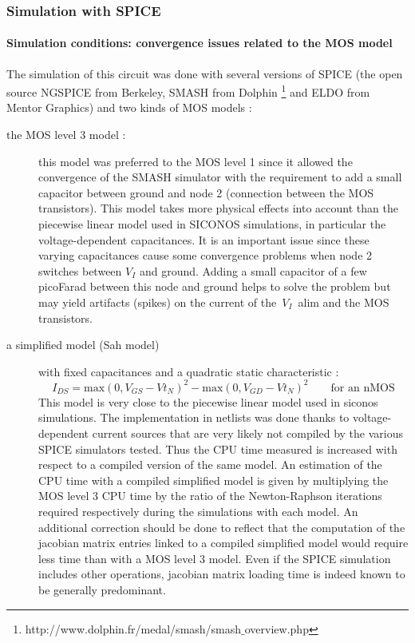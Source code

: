 \documentclass{article}
\begin{document}
\subsubsection{Simulation with SPICE }

\paragraph{Simulation conditions: convergence issues related to the MOS model}
The simulation of this circuit was done with several versions of SPICE (the open source NGSPICE from Berkeley, SMASH from Dolphin \footnote{http://www.dolphin.fr/medal/smash/smash$\_$overview.php} and ELDO from Mentor Graphics) and two kinds of MOS models :
\begin{description}
\item[the MOS level 3 model :] this model was preferred to the MOS level 1 since it allowed the convergence
of the SMASH simulator with the requirement to add a small capacitor between ground and node 2 (connection between
the MOS transistors). This model takes more physical effects into account than the piecewise linear model used in SICONOS simulations,
in particular the voltage-dependent capacitances. It is an important issue since these varying capacitances
cause some convergence problems when node 2 switches between $V_I$ and ground.
Adding a small capacitor of a few picoFarad between this node and ground helps to solve the problem
but may yield artifacts (spikes) on the current of the~$V_I$~alim and the MOS transistors.
\item[a simplified model (Sah model)] with fixed capacitances and a quadratic static characteristic :
\[
I_{DS} = \textrm{max}(0,V_{GS}-Vt_N)^2 - \textrm{max}(0,V_{GD}-Vt_N)^2 \qquad \textrm{for an nMOS}
\]
This model is very close to the piecewise linear model used in {\sc siconos} simulations. The implementation in netlists was done thanks to 
voltage-dependent current sources that are very likely not compiled by the various SPICE simulators tested.
Thus the CPU time measured is increased with respect to a compiled version of the same model.
An estimation of the CPU time with a compiled simplified model is given by multiplying the MOS level 3 CPU time
by the ratio of the Newton-Raphson iterations required respectively during the simulations with each model.
An additional correction should be done to reflect that the computation of the jacobian matrix entries
linked to a compiled simplified model would require less time than with a MOS level 3 model. Even if the SPICE simulation
includes other operations, jacobian matrix loading time is indeed known to be generally predominant.
\end{description}
\end{document}
